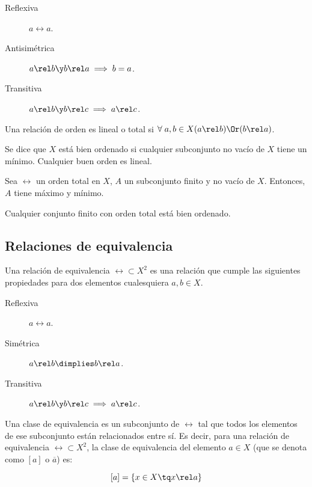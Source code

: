 \documentclass[nochap]{apuntes}
\begin{document}
\begin{description}
\item[Reflexiva] $a\rel a$.
\item[Antisimétrica] $a\rel b \y b\rel a \implies b=a$.
\item[Transitiva] $a\rel b \y b\rel c \implies a\rel c$.
\end{description}

\begin{defn} Una relación de orden es lineal o total si $\forall \; a ,b \in X (a\rel b) \Or (b\rel a)$.\end{defn}

\begin{defn}Se dice que $X$ está bien ordenado si cualquier subconjunto no vacío de $X$ tiene un mínimo. Cualquier buen orden es lineal.\end{defn}

\begin{prop}
Sea $\rel$ un orden total en $X$, $A$ un subconjunto finito y no vacío de $X$. Entonces, $A$ tiene máximo y mínimo.\end{prop}

\begin{prop} Cualquier conjunto finito con orden total está bien ordenado. \end{prop}

\subsection{Relaciones de equivalencia}

Una relación de equivalencia $\rel \subset X^2$ es una relación que cumple las siguientes propiedades para dos elementos cualesquiera $a,b \in X$.

\begin{description}
\item[Reflexiva] $a\rel a$.
\item[Simétrica] $a\rel b \dimplies b\rel a$.
\item[Transitiva] $a\rel b \y b\rel c \implies a\rel c$.
\end{description}

\begin{defn} Una clase de equivalencia es un subconjunto de $\rel$ tal que todos los elementos de ese subconjunto están relacionados entre sí. Es decir, para una relación de equivalencia $\rel\subset X^2$, la clase de equivalencia del elemento $a\in X$ (que se denota como $[a]$ o $\overline{a}$) es:

\[ [a]=\{x\in X \tq x\rel a\} \]
\end{defn}
\end{document}
